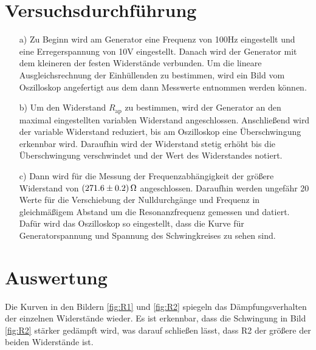 \section{Versuchsdurchführung}\justifying

 \begin{enumerate}

    \item[a)] \justifying Zu Beginn wird am Generator eine Frequenz von 100Hz 
    eingestellt und eine Erregerspannung von 10V eingestellt. Danach wird der 
    Generator mit dem kleineren der festen Widerstände verbunden.
    Um die lineare Ausgleichsrechnung der Einhüllenden zu bestimmen, wird
    ein Bild vom Oszilloskop angefertigt aus dem dann Messwerte entnommen werden
    können.

    \item[b)] \justifying Um den Widerstand $R_{\text{ap}}$ zu bestimmen, wird der Generator 
    an den maximal eingestellten variablen Widerstand angeschlossen. Anschließend wird 
    der variable Widerstand reduziert, bis am Oszilloskop eine Überschwingung erkennbar 
    wird. Daraufhin wird der Widerstand stetig erhöht bis die Überschwingung verschwindet 
    und der Wert des Widerstandes notiert.
  
    \item[c)] \justifying Dann wird für die Messung der Frequenzabhängigkeit
                          der größere Widerstand von $\SI{271.6\pm 0.2}{\ohm}$ angeschlossen.
                          Daraufhin werden ungefähr 20 Werte für die Verschiebung der Nulldurchgänge 
                          und Frequenz in gleichmäßigem Abstand um die 
                          Resonanzfrequenz gemessen und datiert. Dafür wird das Oszilloskop so eingestellt, 
                          dass die Kurve für Generatorspannung und Spannung des Schwingkreises zu sehen sind.
 \end{enumerate}
 \newpage

\section{Auswertung}\justifying


  Die Kurven in den Bildern \ref{fig:R1} und \ref{fig:R2} spiegeln das Dämpfungsverhalten der einzelnen Widerstände wieder. 
  Es ist erkennbar, dass die Schwingung in Bild \ref{fig:R2} stärker gedämpft wird, was darauf schließen lässt, dass R2 der 
  größere der beiden Widerstände ist.


